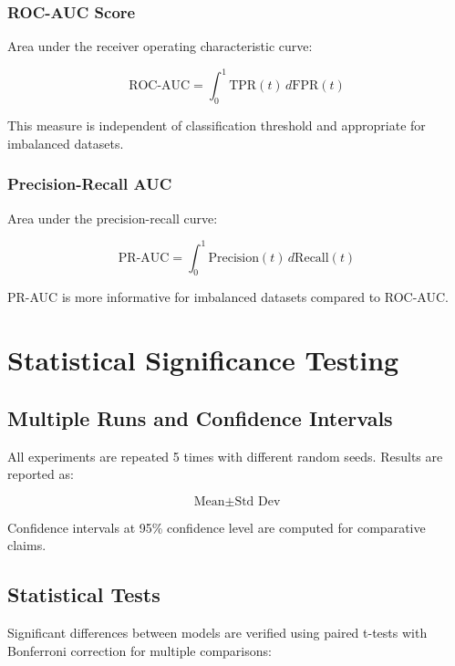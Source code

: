 \subsubsection{ROC-AUC Score}

Area under the receiver operating characteristic curve:

\begin{equation}
\text{ROC-AUC} = \int_0^1 \text{TPR}(t) \, d\text{FPR}(t)
\end{equation}

This measure is independent of classification threshold and appropriate for imbalanced datasets.

\subsubsection{Precision-Recall AUC}

Area under the precision-recall curve:

\begin{equation}
\text{PR-AUC} = \int_0^1 \text{Precision}(t) \, d\text{Recall}(t)
\end{equation}

PR-AUC is more informative for imbalanced datasets compared to ROC-AUC.

\section{Statistical Significance Testing}

\subsection{Multiple Runs and Confidence Intervals}

All experiments are repeated 5 times with different random seeds. Results are reported as:

\begin{equation}
\text{Mean} \pm \text{Std Dev}
\end{equation}

Confidence intervals at 95\% confidence level are computed for comparative claims.

\subsection{Statistical Tests}

Significant differences between models are verified using paired t-tests with Bonferroni correction for multiple comparisons:


